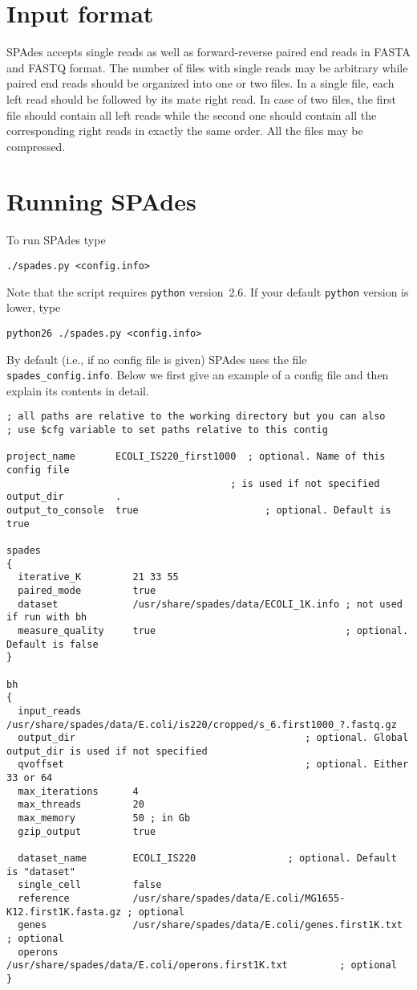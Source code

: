 \documentclass{article}
\def\spades{SPAdes}
\begin{document}
\section{Input format}
{\spades} accepts single reads as well as forward-reverse paired end reads
in FASTA{} and FASTQ format. The number of files with single reads may be arbitrary while paired end reads should be organized into one or two files. In a single file, each left read should be followed by its mate right read. In case of two files, the first file should contain all left reads while
the second one should contain all the corresponding right reads in exactly the same order.
All the files may be compressed.

\section{Running {\spades}}\label{sec:running}
To run {\spades} type
\begin{lstlisting}
./spades.py <config.info>
\end{lstlisting}
Note that the script requires {\tt python} version~2.6.
If your default {\tt python} version is lower, type
\begin{lstlisting}
python26 ./spades.py <config.info>
\end{lstlisting}
By default (i.e., if no config file is given) {\spades} uses the file {\tt spades\_config.info}. 
Below we first give an example of a config file
and then explain its contents in detail.

\begin{lstlisting}													
; all paths are relative to the working directory but you can also 
; use $cfg variable to set paths relative to this contig

project_name       ECOLI_IS220_first1000  ; optional. Name of this config file 
                                       ; is used if not specified
output_dir         .
output_to_console  true                      ; optional. Default is true

spades
{
  iterative_K         21 33 55
  paired_mode         true
  dataset             /usr/share/spades/data/ECOLI_1K.info ; not used if run with bh
  measure_quality     true                                 ; optional. Default is false
}

bh
{
  input_reads         /usr/share/spades/data/E.coli/is220/cropped/s_6.first1000_?.fastq.gz
  output_dir                                        ; optional. Global output_dir is used if not specified
  qvoffset                                          ; optional. Either 33 or 64
  max_iterations      4
  max_threads         20
  max_memory          50 ; in Gb
  gzip_output         true

  dataset_name        ECOLI_IS220                ; optional. Default is "dataset"
  single_cell         false
  reference           /usr/share/spades/data/E.coli/MG1655-K12.first1K.fasta.gz ; optional
  genes               /usr/share/spades/data/E.coli/genes.first1K.txt           ; optional
  operons             /usr/share/spades/data/E.coli/operons.first1K.txt         ; optional
}
\end{lstlisting}
\end{document}
